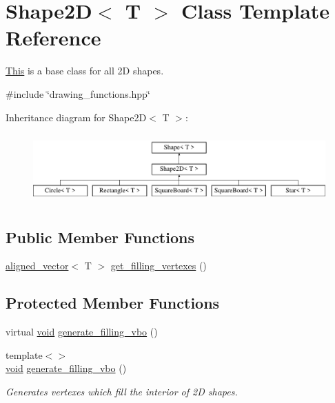 \hypertarget{classShape2D}{}\section{Shape2D$<$ T $>$ Class Template Reference}
\label{classShape2D}


\mbox{\hyperlink{classThis}{This}} is a base class for all 2D shapes.  




{\ttfamily \#include \char`\"{}drawing\+\_\+functions.\+hpp\char`\"{}}

Inheritance diagram for Shape2D$<$ T $>$\+:\begin{figure}[H]
\begin{center}
\leavevmode
\includegraphics[height=2.688000cm]{classShape2D}
\end{center}
\end{figure}
\subsection*{Public Member Functions}
\begin{DoxyCompactItemize}
\item 
\mbox{\hyperlink{type__definitions_8hpp_a087efd587d66b881646ef378f1919c90}{aligned\+\_\+vector}}$<$ T $>$ \mbox{\hyperlink{classShape2D_af67c7aed6e58b5aa0e3518a3ad1de75b}{get\+\_\+filling\+\_\+vertexes}} ()
\end{DoxyCompactItemize}
\subsection*{Protected Member Functions}
\begin{DoxyCompactItemize}
\item 
virtual \mbox{\hyperlink{glad_8h_a950fc91edb4504f62f1c577bf4727c29}{void}} \mbox{\hyperlink{classShape2D_a917c3277ca262ec557930c8cc837c204}{generate\+\_\+filling\+\_\+vbo}} ()
\item 
{\footnotesize template$<$$>$ }\\\mbox{\hyperlink{glad_8h_a950fc91edb4504f62f1c577bf4727c29}{void}} \mbox{\hyperlink{classShape2D_a328d401b8f1962078e904d4b1003d7a5}{generate\+\_\+filling\+\_\+vbo}} ()
\begin{DoxyCompactList}\small\item\em Generates vertexes which fill the interior of 2D shapes. \end{DoxyCompactList}\end{DoxyCompactItemize}
